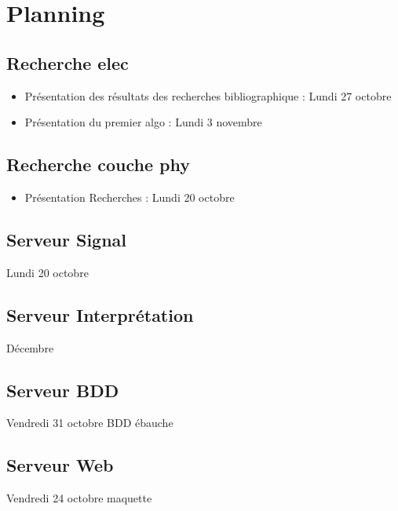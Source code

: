 \documentclass[10pt,a4paper]{article}
\begin{document}
\section{Planning}
\subsection{Recherche elec}
\begin{itemize}
	\item Présentation des résultats des recherches bibliographique : Lundi 27 octobre
	\item Présentation du premier algo : Lundi 3 novembre
\end{itemize}
\subsection{Recherche couche phy}
\begin{itemize}
	\item Présentation Recherches : Lundi 20 octobre
\end{itemize}
\subsection{Serveur Signal}
Lundi 20 octobre
\subsection{Serveur Interprétation}
Décembre
\subsection{Serveur BDD}
Vendredi 31 octobre BDD ébauche
\subsection{Serveur Web}
Vendredi 24 octobre maquette
\end{document}
